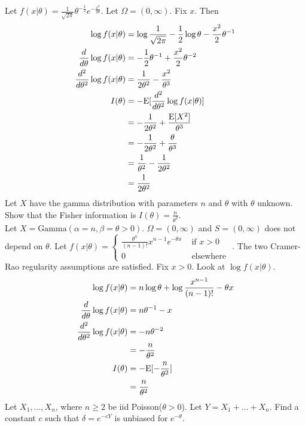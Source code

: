 \documentclass[12pt]{article}
\begin{document}
Let $f(x|\theta) = \frac{1}{\sqrt{2\pi}}\theta^{-\frac{1}{2}}e^{-\frac{x^2}{2\theta}}$. Let $\Omega = (0,\infty)$. Fix $x$. Then $$ \begin{aligned} \log f(x|\theta) &= \log \frac{1}{\sqrt{2\pi}} - \frac{1}{2}\log \theta - \frac{x^2}{2}\theta^{-1} \\ \frac{d}{d\theta} \log f(x | \theta) &= -\frac{1}{2}\theta^{-1} + \frac{x^2}{2}\theta^{-2} \\ \frac{d^2}{d\theta^2} \log f(x | \theta) &= \frac{1}{2\theta^2} - \frac{x^2}{\theta^3} \\ I(\theta) &= -\mathrm{E}[ \frac{d^2}{d\theta^2} \log f(x | \theta) ] \\ &= -\frac{1}{2\theta^2} + \frac{\mathrm{E}[ X^2 ]}{\theta^3} \\ &= -\frac{1}{2\theta^2} + \frac{\theta}{\theta^3} \\ &= \frac{1}{\theta^2} - \frac{1}{2\theta^2} \\ &= \frac{1}{2\theta^2} \end{aligned} $$ 
Let $X$ have the gamma distribution with parameters $n$ and $\theta$ with $\theta$ unknown. Show that the Fisher information is $I(\theta) = \frac{n}{\theta^2}$. \\ 
Let $X = \text{Gamma}(\alpha =n, \beta = \theta > 0)$. $\Omega = (0,\infty)$ and $S = (0,\infty)$ does not depend on $\theta$. Let $f(x | \theta) = \begin{cases} \frac{\theta^n}{(n-1)!} x^{n-1} e^{-\theta x} &\text{ if } x > 0 \\ 0 &\text{ elsewhere } \end{cases} $. The two Cramer-Rao regularity assumptions are satisfied. Fix $x > 0$. Look at $\log f(x | \theta)$. $$ \begin{aligned} \log f(x | \theta) &= n\log \theta + \log \frac{x^{n-1}}{(n-1)!} - \theta x \\ \frac{d}{d\theta} \log f(x | \theta) &= n\theta^{-1} - x \\ \frac{d^2}{d\theta^2} \log f(x|\theta) &= -n\theta^{-2} \\ &= -\frac{n}{\theta^2} \\ I(\theta) &= -\mathrm{E}[ -\frac{n}{\theta^2} ] \\ &= \frac{n}{\theta^2} \end{aligned} $$ 
Let $X_1,\dots,X_n$, where $n\geq 2$ be iid Poisson($\theta > 0$). Let $Y = X_1+\dots+X_n$. Find a constant $c$ such that $\delta = e^{-cY}$ is unbiased for $e^{-\theta}$. \\ 
\end{document}
